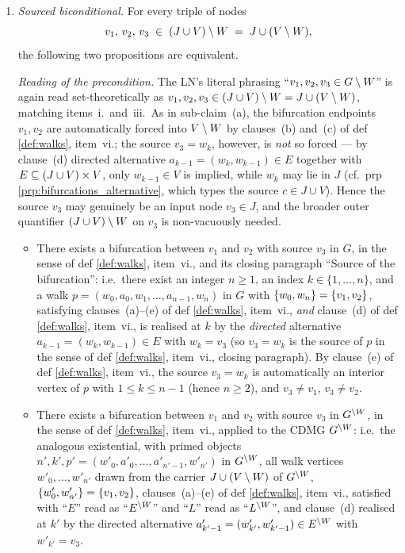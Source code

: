 \documentclass[main]{subfiles}
\begin{document}
\begin{Rem}[MargPreservesAncestors]
\begin{enumerate}[label=\roman*.)]
\begin{enumerate}[label=(\alph*)]
                \item \emph{Sourced biconditional.}
                    For every triple of nodes
                    \[
                        v_1,\, v_2,\, v_3 \;\in\; (J \cup V) \setminus W \;=\; J \cup (V \setminus W),
                    \]
                    the following two propositions are equivalent.

                    \emph{Reading of the precondition.} The LN's literal phrasing ``$v_1, v_2, v_3 \in G \setminus W$'' is again read set-theoretically as $v_1, v_2, v_3 \in (J \cup V) \setminus W = J \cup (V \setminus W)$, matching items~i.\ and~iii.\ As in sub-claim~(a), the bifurcation endpoints $v_1, v_2$ are automatically forced into $V \setminus W$ by clauses~(b) and~(c) of def \ref{def:walks}, item~vi.; the source $v_3 = w_k$, however, is \emph{not} so forced --- by clause~(d) directed alternative $a_{k-1} = (w_k, w_{k-1}) \in E$ together with $E \subseteq (J \cup V) \times V$, only $w_{k-1} \in V$ is implied, while $w_k$ may lie in $J$ (cf.\ prp \ref{prp:bifurcations_alternative}, which types the source $c \in J \cup V$). Hence the source $v_3$ may genuinely be an input node $v_3 \in J$, and the broader outer quantifier $(J \cup V) \setminus W$ on $v_3$ is non-vacuously needed.
                    \begin{itemize}
                        \item There exists a bifurcation between $v_1$ and $v_2$ with source $v_3$ in $G$, in the sense of def \ref{def:walks}, item~vi., and its closing paragraph ``Source of the bifurcation'': i.e.\ there exist an integer $n \ge 1$, an index $k \in \{1, \dots, n\}$, and a walk $p = (w_0, a_0, w_1, \dots, a_{n-1}, w_n)$ in $G$ with $\left \{ w_0, w_n \right \} = \left \{ v_1, v_2 \right \}$, satisfying clauses~(a)--(e) of def \ref{def:walks}, item~vi., \emph{and} clause~(d) of def \ref{def:walks}, item~vi., is realised at $k$ by the \emph{directed} alternative $a_{k-1} = (w_k, w_{k-1}) \in E$ with $w_k = v_3$ (so $v_3 = w_k$ is the source of $p$ in the sense of def \ref{def:walks}, item~vi., closing paragraph). By clause~(e) of def \ref{def:walks}, item~vi., the source $v_3 = w_k$ is automatically an interior vertex of $p$ with $1 \le k \le n - 1$ (hence $n \ge 2$), and $v_3 \ne v_1$, $v_3 \ne v_2$.
                        \item There exists a bifurcation between $v_1$ and $v_2$ with source $v_3$ in $G^{\setminus W}$, in the sense of def \ref{def:walks}, item~vi., applied to the CDMG $G^{\setminus W}$: i.e.\ the analogous existential, with primed objects $n', k', p' = (w'_0, a'_0, \dots, a'_{n' - 1}, w'_{n'})$ in $G^{\setminus W}$, all walk vertices $w'_0, \dots, w'_{n'}$ drawn from the carrier $J \cup (V \setminus W)$ of $G^{\setminus W}$, $\left \{ w'_0, w'_{n'} \right \} = \left \{ v_1, v_2 \right \}$, clauses~(a)--(e) of def \ref{def:walks}, item~vi., satisfied with ``$E$'' read as ``$E^{\setminus W}$'' and ``$L$'' read as ``$L^{\setminus W}$'', and clause~(d) realised at $k'$ by the directed alternative $a'_{k' - 1} = (w'_{k'}, w'_{k' - 1}) \in E^{\setminus W}$ with $w'_{k'} = v_3$.

\end{itemize}
\end{enumerate}
\end{enumerate}
\end{Rem}
\end{document}
